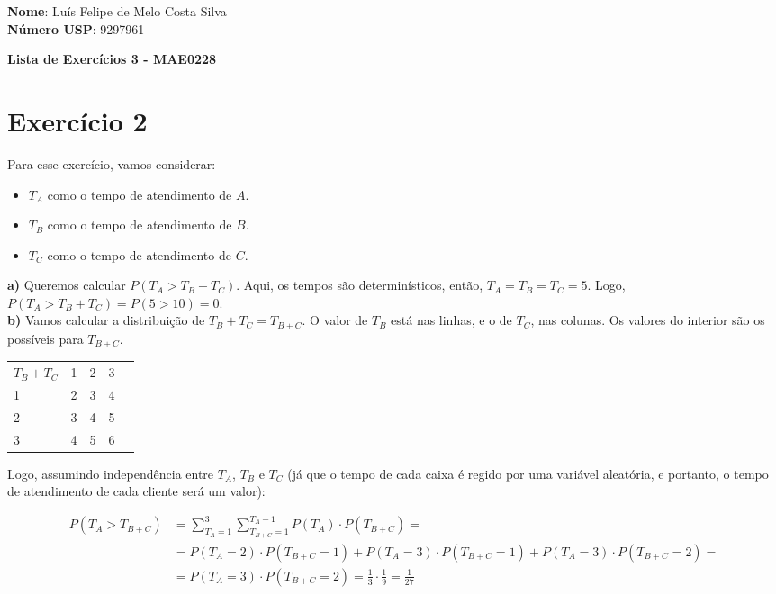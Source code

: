 \documentclass[12pt,letterpaper]{article}
\begin{document}
	
	\textbf{Nome}: Luís Felipe de Melo Costa Silva \\
	\textbf{Número USP}: 9297961 
	
	\begin{center}
		\LARGE \bf
		Lista de Exercícios 3 - MAE0228
	\end{center}
	
	\section*{Exercício 2}
	
	Para esse exercício, vamos considerar:
	
	\begin{itemize}
		\item $T_A$ como o tempo de atendimento de $A$.
		\item $T_B$ como o tempo de atendimento de $B$.
		\item $T_C$ como o tempo de atendimento de $C$.
	\end{itemize}
	
	\textbf{a)} Queremos calcular $P(T_A > T_B + T_C)$. Aqui, os tempos são determinísticos, então, $T_A = T_B = T_C = 5$. Logo, $P(T_A > T_B + T_C) = P(5 > 10) = 0$. \\
	
	\textbf{b)} Vamos calcular a distribuição de $T_B+T_C = T_{B+C}$. O valor de $T_B$ está nas linhas, e o de $T_C$, nas colunas. Os valores do interior são os possíveis para $T_{B+C}$.
	
	\begin{center}
		\begin{tabular}{|l|l|l|l|l}
			\cline{1-4}
			$T_B+T_C$ & 1 & 2 & 3 &  \\ \cline{1-4}
			1         & 2 & 3 & 4 &  \\ \cline{1-4}
			2         & 3 & 4 & 5 &  \\ \cline{1-4}
			3         & 4 & 5 & 6 &  \\ \cline{1-4}
		\end{tabular}
	\end{center}
	
	Logo, assumindo independência entre $T_A$, $T_B$ e $T_C$ (já que o tempo de cada caixa é regido por uma variável aleatória, e portanto, o tempo de atendimento de cada cliente será um valor):
	
	\begin{equation*}
		\begin{split}
			P(T_A > T_{B+C}) & = \sum_{T_A = 1}^{3} \sum_{T_{B+C} = 1}^{T_A-1} P(T_A) \cdot P(T_{B+C}) = \\
			& = P(T_A = 2) \cdot P(T_{B+C} = 1) + P(T_A = 3) \cdot P(T_{B+C} = 1) + P(T_A = 3) \cdot P(T_{B+C} = 2) = \\
			& = P(T_A = 3) \cdot P(T_{B+C} = 2) = \frac{1}{3} \cdot \frac{1}{9} = \frac{1}{27}
		\end{split}
	\end{equation*}
	
\end{document}
